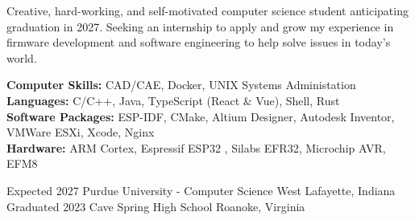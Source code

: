 \documentclass[9pt]{developercv} %
\begin{document}
\vspace{0.5cm}



\begin{minipage}[t]{1\textwidth} %
	\vspace{-\baselineskip} %
	Creative, hard-working, and self-motivated computer science student anticipating graduation in 2027. Seeking an internship to apply and grow my experience in firmware development and software engineering to help solve issues in today's world.
\end{minipage}


\begin{minipage}[t]{1\textwidth} %
	\vspace{-\baselineskip} %
	\textbf{Computer Skills:} CAD/CAE, Docker, UNIX Systems Administation\\
	\textbf{Languages:} C/C++, Java, TypeScript (React \& Vue), Shell, Rust\\
	\textbf{Software Packages:} ESP-IDF, CMake, Altium Designer, Autodesk Inventor, VMWare ESXi, Xcode, Nginx\\
	\textbf{Hardware:} ARM Cortex, Espressif ESP32 , Silabs EFR32, Microchip AVR, EFM8
\end{minipage}



\begin{entrylist}
	\entry
		{Expected 2027}
		{Purdue University - Computer Science}
		{West Lafayette, Indiana}
		{\lorem}
	\entry
		{Graduated 2023}
		{Cave Spring High School}
		{Roanoke, Virginia}
		{\lorem}
\end{entrylist}

\end{document}
